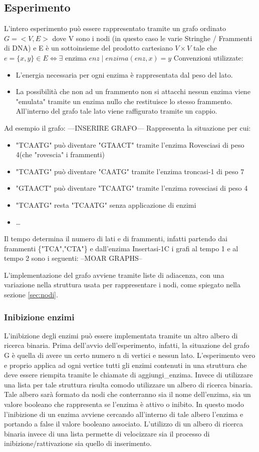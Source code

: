 \documentclass[a4paper,10pt]{article}
\begin{document}
\subsection{Esperimento}
L'intero esperimento può essere rappresentato tramite un grafo ordinato $G=<V,E>$ dove V sono i nodi (in questo caso le varie Stringhe / Frammenti di DNA) e E è un sottoinsieme del prodotto cartesiano $V\times V$ tale che $e = \{x,y\} \in E \iff \exists$ enzima $enz \mid enzima(enz,x)=y$
Convenzioni utilizzate: \begin{itemize}
\item L'energia necessaria per ogni enzima è rappresentata dal peso del lato. \item La possibilità che non ad un frammento non si attacchi nessun enzima viene "emulata" tramite un enzima nullo che restituisce lo stesso frammento. All'interno del grafo tale lato viene raffigurato tramite un cappio.

\end{itemize}
Ad esempio il grafo: ---INSERIRE GRAFO---
Rappresenta la situazione per cui:
\begin{itemize}\item "TCAATG" può diventare "GTAACT" tramite l'enzima Rovesciasi di peso 4(che "rovescia" i frammenti) \item "TCAATG" può diventare "CAATG" tramite l'enzima troncasi-1 di peso 7
\item "GTAACT" può diventare "TCAATG" tramite l'enzima rovesciasi di peso 4
\item "TCAATG" resta "TCAATG" senza applicazione di enzimi
\item \dots
\end{itemize}
Il tempo determina il numero di lati e di frammenti, infatti partendo dai frammenti \{"TCA","CTA"\} e dall'enzima Insertasi-1C i grafi al tempo 1 e al tempo 2 sono i seguenti:
--MOAR GRAPHS--

L'implementazione del grafo avviene tramite liste di adiacenza, con una variazione nella struttura usata per rappresentare i nodi, come spiegato nella sezione \ref{sec:nodi}.

\subsubsection{Inibizione enzimi}
L'inibizione degli enzimi può essere implementata tramite un altro albero di ricerca binaria. Prima dell'avvio dell'esperimento, infatti, la situazione del grafo G è quella di avere un certo numero n di vertici e nessun lato. L'esperimento vero e proprio applica ad ogni vertice tutti gli enzimi contenuti in una struttura che deve essere riempita tramite le chiamate di aggiungi\_enzima. Invece di utilizzare una lista per tale struttura risulta comodo utilizzare un albero di ricerca binaria. Tale albero sarà formato da nodi che conterranno sia il nome dell'enzima, sia un valore booleano che rappresenta se l'enzima è attivo o inibito. In questo modo l'inibizione di un enzima avviene cercando all'interno di tale albero l'enzima e portando a false il valore booleano associato. L'utilizzo di un albero di ricerca binaria invece di una lista permette di velocizzare sia il processo di inibizione/rattivazione sia quello di inserimento.
\end{document}
